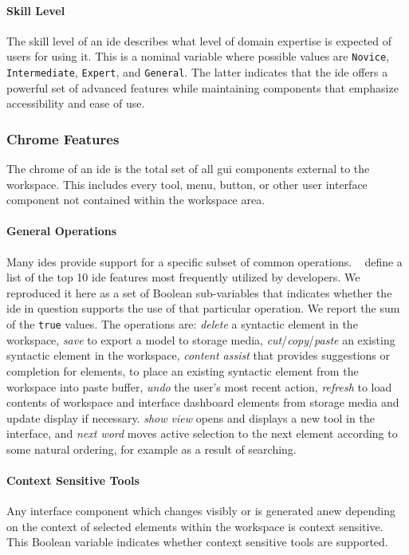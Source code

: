 \paragraph{Skill Level}
The skill level of an \ac{ide} describes what level of domain expertise is expected of users for using it.
This is a nominal variable where possible values are \texttt{Novice}, \texttt{Intermediate}, \texttt{Expert}, and \texttt{General}.
The latter indicates that the \ac{ide} offers a powerful set of advanced features while maintaining components that emphasize accessibility and ease of use.


\subsubsection{Chrome Features} \label{subsubsec:chrome}

The chrome of an \ac{ide} is the total set of all \acf{gui} components
external to the workspace. This includes every tool, menu, button, or other
user interface component not contained within the workspace area.


\paragraph{General Operations}
Many \acp{ide} provide support for a specific subset of common operations.
\citeauthor{murphy2006}~\cite{murphy2006} define a list of the top 10 \ac{ide} features most frequently utilized by developers.
We reproduced it here as a set of Boolean sub-variables that indicates whether the \ac{ide} in question supports the use of that particular operation.
We report the sum of the \texttt{true} values.
The operations are: \emph{delete} a syntactic element in the workspace,
\emph{save} to export a model to storage media,
\emph{cut}/\emph{copy}/\emph{paste} an existing syntactic element in the workspace,
\emph{content assist} that provides suggestions or completion for elements,
 to place an existing syntactic element from the workspace into paste buffer,
\emph{undo} the user's most recent action,
\emph{refresh} to load contents of workspace and interface dashboard elements from storage media and update display if necessary.
\emph{show view} opens and displays a new tool in the interface,
and
\emph{next word} moves active selection to the next element according to some natural ordering, for example as a result of searching.


\paragraph{Context Sensitive Tools}
Any interface component which changes visibly or is generated anew depending on the context of selected elements within the workspace is context sensitive.
This Boolean variable indicates whether context sensitive tools are supported.


